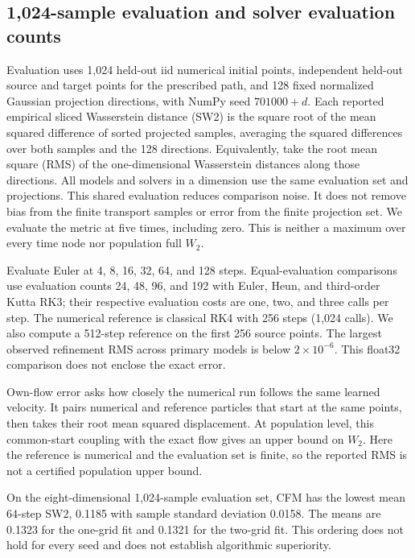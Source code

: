 \subsection{1,024-sample evaluation and solver evaluation counts}
Evaluation uses 1,024 held-out iid numerical initial points, independent
held-out source
and target points for the prescribed path, and 128 fixed normalized Gaussian
projection directions, with NumPy seed $701000+d$. Each reported empirical sliced Wasserstein distance (SW2) is the square
root of the mean squared difference of sorted projected samples, averaging
the squared differences over both samples and the 128 directions.
Equivalently, take the root mean square (RMS) of the one-dimensional
Wasserstein distances along those directions. All models and solvers in a
dimension use the same evaluation set and projections. This shared evaluation reduces
comparison noise. It does not remove bias from the finite transport samples
or error from the finite projection set. We evaluate the metric at five
times, including zero. This is neither a maximum over every time node nor
population full $W_2$.

Evaluate Euler at 4, 8, 16, 32, 64, and 128 steps. Equal-evaluation comparisons
use evaluation counts 24, 48, 96, and 192 with Euler, Heun, and third-order Kutta RK3;
their respective evaluation costs are one, two, and three calls per step.
The numerical reference is classical RK4 with 256 steps (1,024 calls).
We also compute a 512-step reference on the first 256 source points.
The largest observed refinement RMS across primary models is below
$2\times10^{-6}$. This float32 comparison does not enclose the exact error.

Own-flow error asks how closely the numerical run follows the same learned
velocity. It pairs numerical and reference particles that start at the
same points, then takes their root mean squared displacement. At population
level, this common-start coupling with the exact flow gives an upper bound
on $W_2$. Here the reference is numerical and the evaluation set is finite, so the
reported RMS is not a certified population upper bound.



On the eight-dimensional 1,024-sample evaluation set, CFM has the lowest mean
64-step SW2, 0.1185 with sample standard deviation 0.0158. The means are
0.1323 for the one-grid fit and 0.1321 for the two-grid fit. This ordering does not
hold for every seed and does not establish algorithmic superiority.


